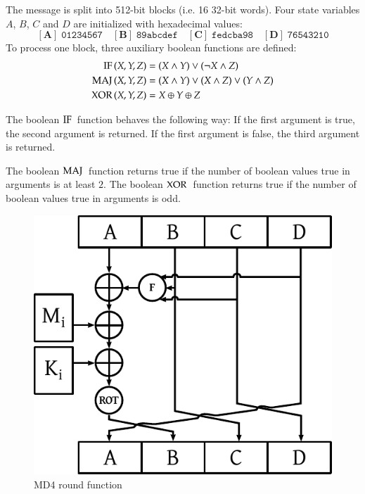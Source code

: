 The message is split into 512-bit blocks (i.e. 16 32-bit words).
Four state variables $A$, $B$, $C$ and $D$ are initialized with hexadecimal values:
\[
  \mathbf{[A]}\; \mathtt{01234567} \quad
  \mathbf{[B]}\; \mathtt{89abcdef} \quad
  \mathbf{[C]}\; \mathtt{fedcba98} \quad
  \mathbf{[D]}\; \mathtt{76543210}
\]
To process one block, three auxiliary boolean functions are defined:
\begin{align}
  \operatorname{\text{IF\,}}(X,Y,Z) &= (X \land Y) \lor (\neg X \land Z) \\
  \operatorname{\text{MAJ\,}}(X,Y,Z) &= (X \land Y) \lor (X \land Z) \lor (Y \land Z) \\
  \operatorname{\text{XOR\,}}(X,Y,Z) &= X \oplus Y \oplus Z
\end{align}

\begin{defi}
  The boolean $\operatorname{\text{IF\,}}$ function behaves the following way:
  If the first argument is true, the second argument is returned.
  If the first argument is false, the third argument is returned.

  The boolean $\operatorname{\text{MAJ\,}}$ function returns true if the number
  of boolean values true in arguments is at least $2$.
  The boolean $\operatorname{\text{XOR\,}}$ function returns true if the number
  of boolean values true in arguments is odd.
\end{defi}

\begin{figure}[t]
  \begin{center}
    \includegraphics{img/md4.pdf}
    \caption{MD4 round function}
    \label{fig:md4-round-function}
  \end{center}
\end{figure}


